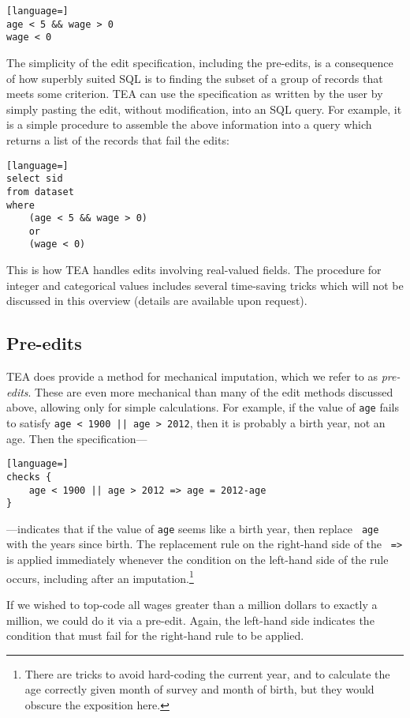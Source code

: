 \documentclass{article}
\begin{document}
\begin{lstlisting}[language=]
age < 5 && wage > 0     		
wage < 0 
\end{lstlisting}

The simplicity of the edit specification, including the pre-edits, is a consequence
of how superbly suited SQL is to finding the subset of a group of records that meets
some criterion. TEA can use the specification as written by the user by simply pasting the
edit, without modification, into an SQL query. For example, it is a simple procedure to
assemble the above information into a query which returns a list of the records that
fail the edits:

\begin{lstlisting}[language=]
select sid 
from dataset
where 
    (age < 5 && wage > 0)
    or 
    (wage < 0)
\end{lstlisting}

This is how TEA handles edits involving real-valued fields. The procedure for integer and
categorical values includes several time-saving tricks which will not be discussed in this
overview (details are available upon request).

\subsection{Pre-edits} TEA does provide a method for mechanical imputation, which we refer
to as {\em pre-edits}. These are even more mechanical than many of the edit methods
discussed above, allowing only for simple calculations. For example, if the value of
{\tt age} fails to satisfy {\tt age < 1900 || age > 2012}, then it is probably a birth
year, not an age. Then the specification---

\begin{lstlisting}[language=]
checks { 
    age < 1900 || age > 2012 => age = 2012-age
}
\end{lstlisting}

---indicates that if the value of {\tt age} seems like a birth year, then replace {\tt
age} with the years since birth. The replacement rule on the right-hand side of the {\tt
=>} is applied immediately whenever the condition on the left-hand side of the rule
occurs, including after an imputation.\footnote{There are tricks to avoid hard-coding
the current year, and to calculate the age correctly given month of survey and month
of birth, but they would obscure the exposition here.}

If we wished to top-code all wages greater than a million dollars to exactly a million, we
could do it via a pre-edit. Again, the left-hand side indicates the condition that must
fail for the right-hand rule to be applied.
\end{document}

